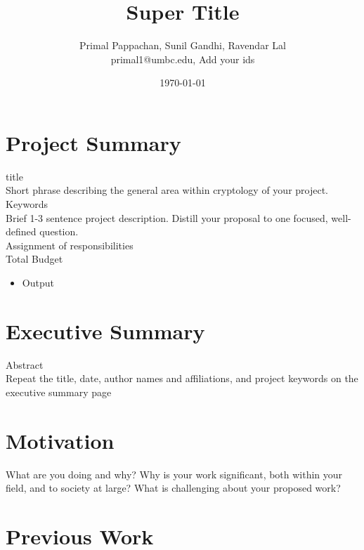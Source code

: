 \documentclass[a4paper,11pt]{article}
\begin{document}

\title{Super Title}
\author{Primal Pappachan, Sunil Gandhi, Ravendar Lal \\ 
\texttt{}primal1@umbc.edu, Add your ids}
\date{\today}
\maketitle


\section{Project Summary}

title \\
Short phrase describing the general area within cryptology of your project. \\
Keywords \\
Brief 1-3 sentence project description. Distill your proposal to one focused, well-defined question. \\
Assignment of responsibilities \\
Total Budget \\


\begin{itemize}
\item Output
\end{itemize}


\section{Executive Summary}

Abstract \\

Repeat the title, date,
author names and affiliations, and project keywords on the executive summary page


\section{Motivation}


What are you doing and why? Why is your work significant, both within your field, and to society at
large? What is challenging about your proposed work?


\section{Previous Work}
\end{document}
